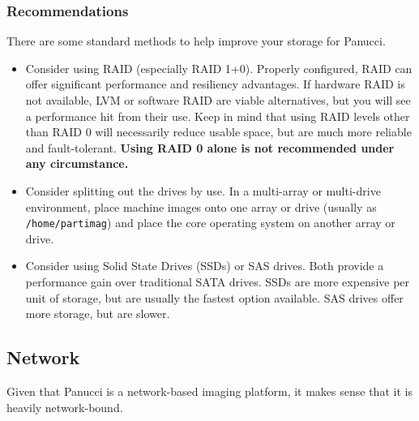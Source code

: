\documentclass{article}
\def\code#1{\texttt{#1}}
\begin{document}
\begin{flushleft}
\subsubsection{Recommendations}
There are some standard methods to help improve your storage for Panucci.
\begin{itemize}
  \item Consider using RAID (especially RAID 1+0).  Properly configured, RAID can offer significant performance and resiliency advantages.  If hardware RAID is not available, LVM or software RAID are viable alternatives, but you will see a performance hit from their use.  Keep in mind that using RAID levels other than RAID 0 will necessarily reduce usable space, but are much more reliable and fault-tolerant.  \textbf{Using RAID 0 alone is not recommended under any circumstance.}
  \item Consider splitting out the drives by use.  In a multi-array or multi-drive environment, place machine images onto one array or drive (usually as \code{/home/partimag}) and place the core operating system on another array or drive.
  \item Consider using Solid State Drives (SSDs) or SAS drives.  Both provide a performance gain over traditional SATA drives.  SSDs are more expensive per unit of storage, but are usually the fastest option available.  SAS drives offer more storage, but are slower.
\end{itemize}
\subsection{Network}
Given that Panucci is a network-based imaging platform, it makes sense that it is heavily network-bound.

\end{flushleft}
\end{document}
